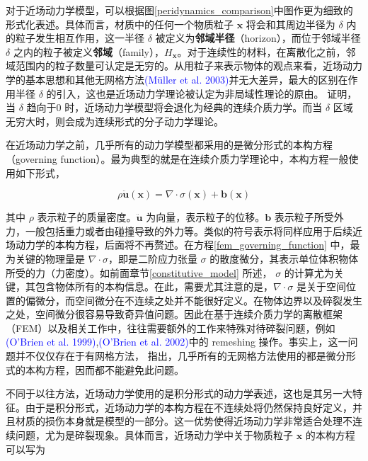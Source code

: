 对于近场动力学模型，可以根据图\ref{peridynamics_comparison}中图作更为细致的形式化表述。具体而言，材质中的任何一个物质粒子 $\mathbf{x}$ 将会和其周边半径为 $\delta$ 内的粒子发生相互作用，这一半径 $\delta$ 被定义为\textbf{邻域半径}（horizon），而位于邻域半径 $\delta$ 之内的粒子被定义\textbf{邻域}（family），$H_\mathbf{x}$。对于连续性的材料，在离散化之前，邻域范围内的粒子数量可认定是无穷的。从用粒子来表示物体的观点来看，近场动力学的基本思想和其他无网格方法\textcolor{blue}{(M\"{u}ller et al. 2003)\supercite{Muller2003}}并无大差异，最大的区别在作用半径 $\delta$ 的引入，这也是近场动力学理论被认定为非局域性理论的原由。 证明，当 $\delta$ 趋向于0 时，近场动力学模型将会退化为经典的连续介质力学。而当 $\delta$ 区域无穷大时，则会成为连续形式的分子动力学理论。

在近场动力学之前，几乎所有的动力学模型都采用的是微分形式的本构方程（governing function）。最为典型的就是在连续介质力学理论中，本构方程一般使用如下形式，

\begin{equation}
\label{fem_governing_function}
\rho\ddot{\mathbf{u}}(\mathbf{x}) = \nabla\cdot\sigma(\mathbf{x})+\mathbf{b}(\mathbf{x})
\end{equation}

其中 $\rho$ 表示粒子的质量密度。$\ddot{\mathbf{u}}$ 为向量，表示粒子的位移。$\mathbf{b}$ 表示粒子所受外力，一般包括重力或者由碰撞导致的外力等。类似的符号表示将同样应用于后续近场动力学的本构方程，后面将不再赘述。在方程\ref{fem_governing_function} 中，最为关键的物理量是 $\nabla\cdot\sigma$，即是二阶应力张量 $\sigma$ 的散度微分，其表示单位体积物体所受的力（力密度）。如前面章节\ref{constitutive_model} 所述， $\sigma$ 的计算尤为关键，其包含物体所有的本构信息。在此，需要尤其注意的是，$\nabla\cdot\sigma$ 是关于空间位置的偏微分，而空间微分在不连续之处并不能很好定义。在物体边界以及碎裂发生之处，空间微分很容易导致奇异值问题。因此在基于连续介质力学的离散框架（FEM）以及相关工作中，往往需要额外的工作来特殊对待碎裂问题，例如\textcolor{blue}{(O'Brien et al. 1999)\supercite{OBrien1999}},\textcolor{blue}{(O'Brien et al. 2002)\supercite{OBrien2002}}中的 remeshing 操作。事实上，这一问题并不仅仅存在于有网格方法， 指出，几乎所有的无网格方法使用的都是微分形式的本构方程，因而都不能避免此问题。

不同于以往方法，近场动力学使用的是积分形式的动力学表述，这也是其另一大特征。由于是积分形式，近场动力学的本构方程在不连续处将仍然保持良好定义，并且材质的损伤本身就是模型的一部分。这一优势使得近场动力学非常适合处理不连续问题，尤为是碎裂现象。具体而言，近场动力学中关于物质粒子 $\mathbf{x}$ 的本构方程可以写为

